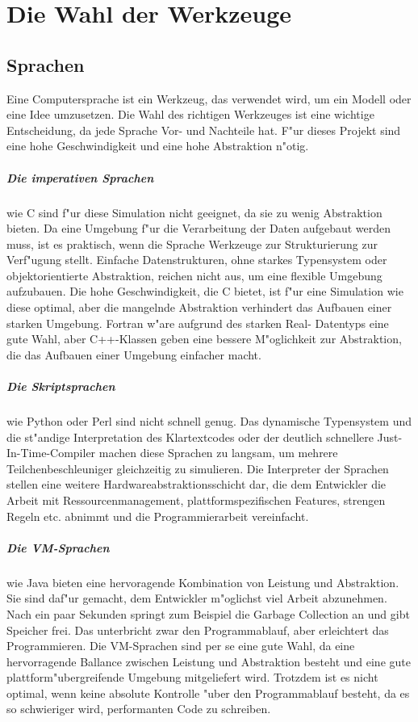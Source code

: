 \documentclass[14pt, a4paper]{report}
\begin{document}
\chapter{Die Wahl der Werkzeuge}
\section{Sprachen}
Eine Computersprache ist ein Werkzeug, das verwendet wird, um ein Modell oder eine Idee
umzusetzen. Die Wahl des richtigen Werkzeuges ist eine wichtige Entscheidung, da jede
Sprache Vor- und Nachteile hat. F"ur dieses Projekt sind eine hohe Geschwindigkeit 
und eine hohe Abstraktion n"otig.

\paragraph{Die imperativen Sprachen} wie C sind f"ur diese Simulation
nicht geeignet, da sie zu wenig Abstraktion bieten. Da eine Umgebung f"ur die 
Verarbeitung der Daten aufgebaut werden 
muss, ist es praktisch, wenn die Sprache Werkzeuge zur Strukturierung zur Verf"ugung 
stellt. Einfache Datenstrukturen, ohne starkes Typensystem oder 
objektorientierte Abstraktion,
reichen nicht aus, um eine flexible Umgebung aufzubauen. Die hohe Geschwindigkeit, die
C bietet, ist f"ur eine Simulation wie diese optimal, aber die mangelnde Abstraktion
verhindert das Aufbauen einer starken Umgebung. Fortran w"are aufgrund des starken Real-
Datentyps eine gute Wahl, aber C++-Klassen geben eine bessere M"oglichkeit zur 
Abstraktion, die das Aufbauen einer Umgebung einfacher macht.

\paragraph{Die Skriptsprachen} wie Python oder Perl sind nicht schnell genug.
Das dynamische Typensystem und die st"andige Interpretation des Klartextcodes oder 
der deutlich schnellere Just-In-Time-Compiler machen 
diese Sprachen zu langsam, um mehrere Teilchenbeschleuniger gleichzeitig zu 
simulieren. Die Interpreter der Sprachen stellen eine weitere Hardwareabstraktionsschicht
dar, die dem Entwickler die Arbeit mit Ressourcenmanagement, plattformspezifischen Features,
strengen Regeln etc. abnimmt und die Programmierarbeit vereinfacht.

\paragraph{Die VM-Sprachen} wie Java bieten eine hervoragende Kombination von 
Leistung und Abstraktion. Sie sind daf"ur gemacht, dem Entwickler m"oglichst viel Arbeit
abzunehmen. Nach ein paar Sekunden springt zum Beispiel die Garbage Collection an und
gibt Speicher frei. Das unterbricht zwar den Programmablauf, aber erleichtert das Programmieren. 
Die VM-Sprachen sind per se eine gute Wahl, da eine hervorragende Ballance zwischen Leistung und Abstraktion 
besteht und eine gute plattform"ubergreifende Umgebung mitgeliefert wird. 
Trotzdem ist es nicht optimal, wenn keine absolute  Kontrolle "uber den Programmablauf besteht, da es so
schwieriger wird, performanten Code zu schreiben.
\end{document}
